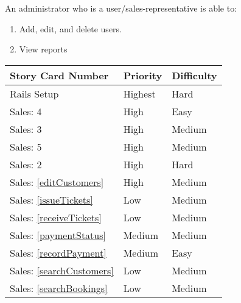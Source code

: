 An administrator who is a user/sales-representative is able to:
\begin{enumerate}
	\item Add, edit, and delete users.
	\item View reports
\end{enumerate}

\begin{table}[h]
	\begin{tabular}{| p{4cm} | p{4cm} | p{4cm} |}
		\hline
			\textbf{Story Card Number} & \textbf{Priority} & \textbf{Difficulty} \\
		\hline
			Rails Setup & Highest & Hard \\
		\hline
			Sales: 4 & High & Easy \\
		\hline
			Sales: 3 & High & Medium \\
		\hline
			Sales: 5 & High & Medium \\
		\hline
			Sales: 2 & High & Hard \\
		\hline
			Sales: \ref{editCustomers} & High & Medium \\
		\hline
			Sales: \ref{issueTickets} & Low & Medium \\
		\hline
			Sales: \ref{receiveTickets} & Low & Medium \\
		\hline
			Sales: \ref{paymentStatus} & Medium & Medium \\
		\hline
			Sales: \ref{recordPayment} & Medium & Easy \\
		\hline
			Sales: \ref{searchCustomers} & Low & Medium \\
		\hline
			Sales: \ref{searchBookings} & Low & Medium \\
		\hline
			
		\hline
	\end{tabular}
\end{table}
